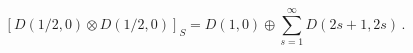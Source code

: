 \begin{equation}\label{eq:onezerotower}
\left[D(1/2,0)\otimes D(1/2,0)\right]_S=D(1,0)\oplus\sum_{s=1}^{\infty} D(2s+1,2s)\,.
\end{equation}

